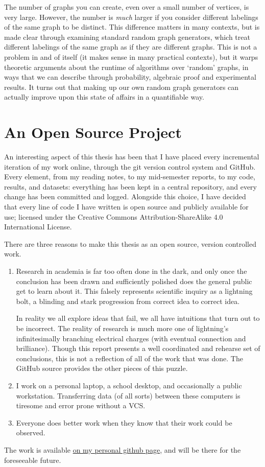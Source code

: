 The number of graphs you can create, even over a small number of vertices, is very large.
However, the number is \emph{much} larger if you consider different labelings of the same graph to be distinct.
This difference matters in many contexts, but is made clear through examining standard random graph generators, which treat different labelings of the same graph as if they are different graphs. 
This is not a problem in and of itself (it makes sense in many practical contexts), but it warps theoretic arguments about the runtime of algorithms over `random' graphs, in ways that we can describe through probability, algebraic proof and experimental results.
It turns out that making up our own random graph generators can actually improve upon this state of affairs in a quantifiable way.

\chapter*{An Open Source Project}

An interesting aspect of this thesis has been that I have placed every incremental iteration of my work online, through the git version control system and GitHub.
Every element, from my reading notes, to my mid-semester reports, to my code, results, and datasets: everything has been kept in a central repository, and every change has been committed and logged.
Alongside this choice, I have decided that every line of code I have written is open source and publicly available for use; licensed under the Creative Commons Attribution-ShareAlike 4.0 International License.

There are three reasons to make this thesis as an open source, version controlled work.
\begin{enumerate}
\item{
Research in academia is far too often done in the dark, and only once the conclusion has been drawn and sufficiently polished does the general public get to learn about it. 
This falsely represents scientific inquiry as a lightning bolt, a blinding and stark progression from correct idea to correct idea. 

In reality we all explore ideas that fail, we all have intuitions that turn out to be incorrect.
The reality of research is much more one of lightning's infinitesimally branching electrical charges (with eventual connection and brilliance). Though this report presents a well coordinated and rehearse set of conclusions, this is not a reflection of all of the work that was done. The GitHub source provides the other pieces of this puzzle.
}
\item{I work on a personal laptop, a school desktop, and occasionally a public workstation. Transferring data (of all sorts) between these computers is tiresome and error prone without a VCS.}
\item{Everyone does better work when they know that their work could be observed.}
\end{enumerate}

The work is available \href{http://www.github.com/gbdubs/thesis}{on my personal github page}, and will be there for the foreseeable future.